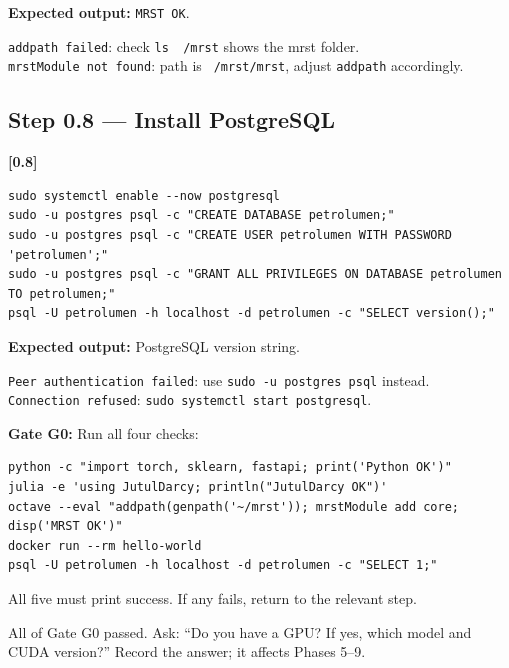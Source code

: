 \documentclass[10pt,a4paper]{article}
\newcommand{\stepID}[1]{\textsf{\textbf{[#1]}}}
\newcommand{\cmd}[1]{\texttt{#1}}
\begin{document}
\textbf{Expected output:} \cmd{MRST OK}.

\begin{failure}
\texttt{addpath failed}: check \cmd{ls ~/mrst} shows the mrst folder.\\
\texttt{mrstModule not found}: path is \cmd{~/mrst/mrst}, adjust \cmd{addpath} accordingly.
\end{failure}

\subsection{Step 0.8 --- Install PostgreSQL}

\stepID{0.8}
\begin{lstlisting}[style=sh]
sudo systemctl enable --now postgresql
sudo -u postgres psql -c "CREATE DATABASE petrolumen;"
sudo -u postgres psql -c "CREATE USER petrolumen WITH PASSWORD 'petrolumen';"
sudo -u postgres psql -c "GRANT ALL PRIVILEGES ON DATABASE petrolumen TO petrolumen;"
psql -U petrolumen -h localhost -d petrolumen -c "SELECT version();"
\end{lstlisting}

\textbf{Expected output:} PostgreSQL version string.

\begin{failure}
\texttt{Peer authentication failed}: use \cmd{sudo -u postgres psql} instead.\\
\texttt{Connection refused}: \cmd{sudo systemctl start postgresql}.
\end{failure}

\begin{gate}
\textbf{Gate G0:} Run all four checks:
\begin{lstlisting}[style=sh]
python -c "import torch, sklearn, fastapi; print('Python OK')"
julia -e 'using JutulDarcy; println("JutulDarcy OK")'
octave --eval "addpath(genpath('~/mrst')); mrstModule add core; disp('MRST OK')"
docker run --rm hello-world
psql -U petrolumen -h localhost -d petrolumen -c "SELECT 1;"
\end{lstlisting}
All five must print success. If any fails, return to the relevant step.
\end{gate}

\begin{aicheckpoint}
All of Gate G0 passed. Ask: ``Do you have a GPU? If yes, which model and CUDA version?'' Record the answer; it affects Phases 5--9.
\end{aicheckpoint}

\end{document}
